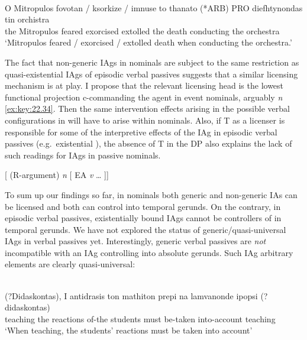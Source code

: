 \documentclass[output=paper]{langsci/langscibook}
\begin{document}
\ea%
\label{ex:key:22.33} \\
    \gll    O  Mitropulos  fovotan / ksorkize / imnuse  to  thanato (*ARB) PRO    diefhtynondas     tin  orchistra\\
            the  Mitropulos  feared {} exorcised {} extolled  the  death {} {} conducting      the  orchestra\\
    \glt    \enquote*{Mitropulos feared / exorcised / extolled death when conducting the orchestra.}
\z

The fact that non-generic \glspl{IAg} in nominals are subject to the same restriction
as quasi-existential \glspl{IAg} of episodic verbal passives suggests that a similar
licensing mechanism is at play. I propose that the relevant licensing head is
the lowest functional projection c-commanding the agent in event nominals,
arguably \emph{n} \eqref{ex:key:22.34}.  Then the same intervention effects arising in the
possible verbal configurations in  will have to arise within
nominals. Also, if T as a licenser is responsible for some of the interpretive
effects of the \gls{IAg} in episodic verbal passives (e.g.\ existential ), the
absence of T in the DP also explains the lack of such readings for \glspl{IAg} in
passive nominals.

\ea%
    \label{ex:key:22.34}
    {}[ (R-argument) \emph{n} [  \gls{EA}  \emph{v} \dots{} ]]
\z

To sum up our findings so far, in  nominals both generic and non-generic
IAs can be licensed and both can control into temporal gerunds. On the
contrary, in episodic verbal passives, existentially bound \glspl{IAg} cannot be
controllers of  in temporal gerunds. We have not explored the
status of generic/quasi-universal \glspl{IAg} in verbal passives yet. Interestingly,
generic verbal passives are \emph{not} incompatible with an \gls{IAg} controlling into
absolute gerunds. Such \gls{IAg} arbitrary elements are
clearly quasi-universal:

\ea%
    \label{ex:key:22.35}\\
    \gll    (?Didaskontas),   I  antidrasis ton     mathiton  prepi  {na lamvanonde} ipopsi     (?didaskontas)\\
            \hphantom{(?}teaching  the  reactions of-the students  must  be-taken into-account  \hphantom{(?}teaching\\
    \glt    ‘When teaching, the students’ reactions must be taken into account’
\z
\end{document}
